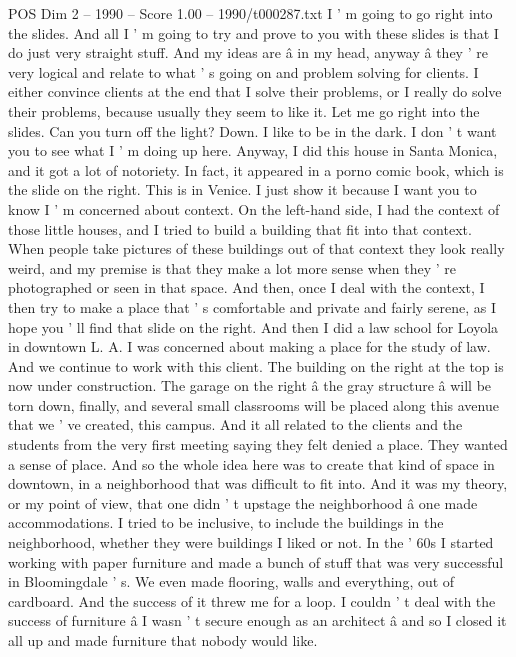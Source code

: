\begin{textsample}{POS Dim 2 – 1990 – Score 1.00 – 1990/t000287.txt}  \label{ex:f2_pos_097}
I ' m going to go right into the slides.
And all I ' m going to try and prove to you with these slides is that I do just very straight stuff.
And my ideas are â in my head, anyway â they ' re very logical and relate to what ' s going on and problem solving for clients.
I either convince clients at the end that I solve their problems, or I really do solve their problems, because usually they seem to like it.
Let me go right into the slides.
Can you turn off the light?
Down.
I like to be in the dark.
I don ' t want you to see what I ' m doing up here.
Anyway, I did this house in Santa Monica, and it got a lot of notoriety.
In fact, it appeared in a porno comic book, which is the slide on the right.
This is in Venice.
I just show it because I want you to know I ' m concerned about context.
On the left-hand side, I had the context of those little houses, and I tried to build a building that fit into that context.
When people take pictures of these buildings out of that context they look really weird, and my premise is that they make a lot more sense when they ' re photographed or seen in that space.
And then, once I deal with the context, I then try to make a place that ' s comfortable and private and fairly serene, as I hope you ' ll find that slide on the right.
And then I did a law school for Loyola in downtown L.
A.
I was concerned about making a place for the study of law.
And we continue to work with this client.
The building on the right at the top is now under construction.
The garage on the right â the gray structure â will be torn down, finally, and several small classrooms will be placed along this avenue that we ' ve created, this campus.
And it all related to the clients and the students from the very first meeting saying they felt denied a place.
They wanted a sense of place.
And so the whole idea here was to create that kind of space in downtown, in a neighborhood that was difficult to fit into.
And it was my theory, or my point of view, that one didn ' t upstage the neighborhood â one made accommodations.
I tried to be inclusive, to include the buildings in the neighborhood, whether they were buildings I liked or not.
In the ' 60s I started working with paper furniture and made a bunch of stuff that was very successful in Bloomingdale ' s.
We even made flooring, walls and everything, out of cardboard.
And the success of it threw me for a loop.
I couldn ' t deal with the success of furniture â I wasn ' t secure enough as an architect â and so I closed it all up and made furniture that nobody would like.

\end{textsample}
